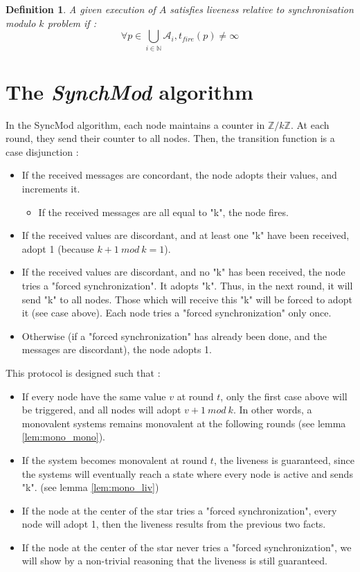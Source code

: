 \documentclass{article}
\newtheorem{definition}{Definition}
\begin{document}
\begin{definition}
	A given execution of $A$ satisfies liveness relative to synchronisation modulo $k$ problem if :
	$$\forall p \in \bigcup\limits_{i \in \mathds{N}} \mathcal{A}_i, t_{fire}(p) \neq \infty$$
\end{definition}

\section{The \textit{SynchMod} algorithm}

In the SyncMod algorithm, each node maintains a counter in $\mathds{Z}/k\mathds{Z}$. At each round,
they send their counter to all nodes.
Then, the transition function is a case disjunction :
\begin{itemize}
	\item If the received messages are concordant, the node adopts their values, and increments it.
		\begin{itemize}
			\item If the received messages are all equal to "k", the node fires.
		\end{itemize}
	\item If the received values are discordant, and at least one "k" have been received, adopt 1 (because $k+1~mod~k = 1$).
	\item If the received values are discordant, and no "k" has been received, the node tries a "forced synchronization". It adopts "k".
		Thus, in the next round, it will send "k" to all nodes. Those which will receive this "k" will be forced to adopt it (see case above).
		Each node tries a "forced synchronization" only once.
	\item Otherwise (if a "forced synchronization" has already been done, and the messages are discordant), the node adopts 1.
\end{itemize}

\noindent This protocol is designed such that :
\begin{itemize}
	\item If every node have the same value $v$ at round $t$, only the first case above will be triggered, and all nodes will adopt $v+1~mod~k$.
		In other words, a monovalent systems remains monovalent at the following rounds (see lemma \ref{lem:mono_mono}).
	\item If the system becomes monovalent at round $t$, the liveness is guaranteed, since the systems will eventually reach a state where every node is active and sends "k".
		(see lemma \ref{lem:mono_liv})
	\item If the node at the center of the star tries a "forced synchronization", every node will adopt 1, then the liveness results from the previous two facts.
	\item If the node at the center of the star never tries a "forced synchronization", we will show by a non-trivial reasoning that the liveness is still guaranteed.
\end{itemize}
\end{document}
